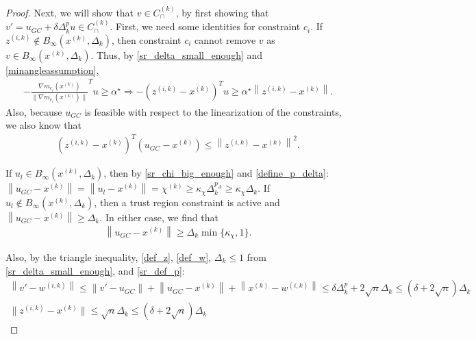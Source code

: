 \documentclass{article}
\theoremstyle{case}
\newcommand{\xk}{{x^{(k)}}}
\newcommand{\dk}{\Delta_k}
\newcommand{\chik}{{\chi^{(k)}}}
\newcommand{\zik}{{z^{(i, k)}}}
\newcommand{\wik}{{w^{(i, k)}}}
\newcommand{\gmcik}{{\nabla m_{c_i}(\xk)}}
\newcommand{\capcones}{{C^{(k)}_{\cap}}}
\newcommand{\minanglealpha}{{ \alpha^{\star} }}
\newcommand{\tr}{{ B_{\infty}\left(\xk, \dk\right) }}
\begin{document}
\begin{proof}
Next, we will show that $v \in \capcones$, by first showing that $v' = u_{GC} + \delta \dk^{p} u \in \capcones$.
First, we need some identities for constraint $c_i$.
\color{red}
If $\zik \not \in \tr$, then constraint $c_i$ cannot remove $v$ as $v\in\tr$.
\color{black}
Thus, by \cref{sr_delta_small_enough} and \cref{minangleassumption}, 
\begin{align}
-\frac {\gmcik}{\|\gmcik\|} ^Tu \ge \minanglealpha \Longrightarrow -\left(\zik - \xk\right)^Tu \ge \minanglealpha \left\|\zik - \xk\right\|. \label{u_is_feasible}
\end{align}
Also, because $u_{GC}$ is feasible with respect to the linearization of the constraints, we also know that
\begin{align}
\left(\zik - \xk\right)^T(u_{GC} - \xk) \le \left\|\zik - \xk\right\|^2. \label{gc_is_feasible}
\end{align}

If $u_l \in \tr$, then by \cref{sr_chi_big_enough} and \cref{define_p_delta}: $\left\|u_{GC} - \xk\right\|  = \left\|u_{l} - \xk\right\| = \chik \ge \kappa_{\chi} \dk^{p_{\Delta}} \ge  \kappa_{\chi} \dk$.
If $u_l \not \in \tr$, then a trust region constraint is active and $\left\|u_{GC} - \xk\right\| \ge \dk$.
In either case, we find that 
\begin{align}
\left\|u_{GC} - \xk\right\| \ge \dk \min\{\kappa_{\chi}, 1 \} \label{gc_big_enough}.
\end{align}


Also, by the triangle inequality, \cref{def_z}, \cref{def_w}, $\dk \le 1$ from \cref{sr_delta_small_enough}, and \cref{sr_def_p}:
\begin{align}
\left\|v' - \wik\right\| \le \left\|v' - u_{GC}\right\| + \left\|u_{GC} - \xk \right\| + \left\|\xk - \wik\right\| \le \delta \dk^p + 2\sqrt{n}\dk \le \left(\delta + 2\sqrt{n}\right)\dk \label{sr_v_minus_w_small} \\
\|\zik - \xk \| \le \sqrt{n}\dk \le \left(\delta + 2\sqrt{n}\right)\dk \label{sr_z_minus_x_small}
\end{align}


\end{proof}
\end{document}
